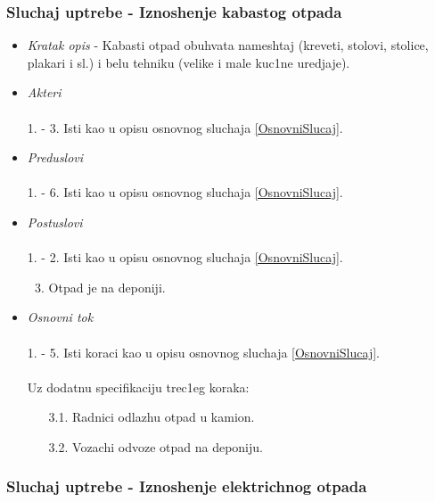 \documentclass[10 pt]{article}
\begin{document}
	\subsubsection{Sluchaj uptrebe - Iznoshenje kabastog otpada}
		
		\begin{itemize}
			\item\textit{Kratak opis} - Kabasti otpad obuhvata nameshtaj (kreveti, stolovi, stolice, plakari i sl.) i belu tehniku (velike i male kuc1ne uredjaje).
			
			\item\textit{Akteri}\\\\ 
			1. - 3. Isti kao u opisu osnovnog sluchaja \ref{OsnovniSlucaj}. 
			
			\item\textit{Preduslovi}\\\\ 
			1. - 6. Isti kao u opisu osnovnog sluchaja \ref{OsnovniSlucaj}.
			
			\item\textit{Postuslovi}\\\\
			1. - 2. Isti kao u opisu osnovnog sluchaja \ref{OsnovniSlucaj}.
				\begin{enumerate}
					\setcounter{enumi}{2}
					\item Otpad je na deponiji.
				\end{enumerate}
			
			\item\textit{Osnovni tok}\\\\
			1. - 5. Isti koraci kao u opisu osnovnog sluchaja \ref{OsnovniSlucaj}.\\\\
			Uz dodatnu specifikaciju trec1eg koraka:
				\begin{enumerate}
					\item [3.1.] Radnici odlazhu otpad u kamion.
					\item [3.2.] Vozachi odvoze otpad na deponiju.
				\end{enumerate}

		\end{itemize}
	
	\subsubsection{Sluchaj uptrebe - Iznoshenje elektrichnog otpada}
		
\end{document}
